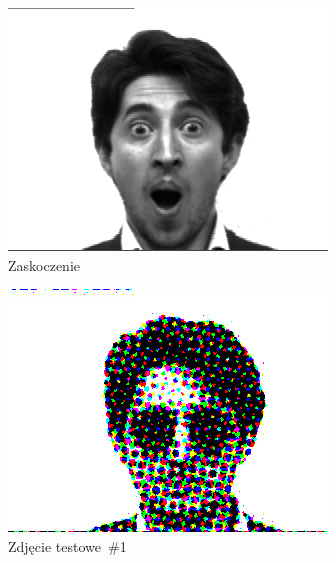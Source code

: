 \documentclass[a4paper,titlepage]{article}
\theoremstyle{break}
\numberwithin{equation}{subsection}
\begin{document}
\begin{figure}[H]
\begin{subfigure}[b]{0.3\textwidth}
		\includegraphics[width=\textwidth]{img/yale-faces/subject03-surprised}
		\caption{Zaskoczenie}
		\label{fig:mouse}
	\end{subfigure}
	\begin{subfigure}[b]{0.3\textwidth}
		\includegraphics[width=\textwidth]{img/yale-faces/modified-subject03-glasses-1}
		\caption{Zdjęcie testowe~\#1}
		\label{fig:mouse}
	\end{subfigure}
	\begin{subfigure}[b]{0.3\textwidth}

\end{subfigure}
\end{figure}
\end{document}

